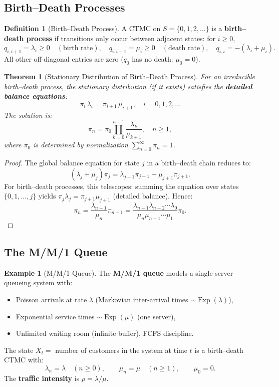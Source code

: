 \documentclass[12pt, a4paper]{article}
\theoremstyle{definition}
\newtheorem{definition}{Definition}[section]
\newtheorem{example}{Example}[section]
\theoremstyle{plain}
\newtheorem{theorem}{Theorem}[section]
\DeclareMathOperator{\Exp}{Exp}
\begin{document}
\subsection{Birth--Death Processes}

\begin{definition}[Birth--Death Process]
A CTMC on $S = \{0,1,2,\ldots\}$ is a \textbf{birth--death process} if transitions only occur between adjacent states: for $i\ge 0$,
\[
  q_{i,i+1} = \lambda_i \ge 0 \quad (\text{birth rate}), \quad q_{i,i-1} = \mu_i \ge 0 \quad (\text{death rate}), \quad q_{i,i} = -(\lambda_i+\mu_i).
\]
All other off-diagonal entries are zero ($q_0$ has no death: $\mu_0=0$).
\end{definition}

\begin{theorem}[Stationary Distribution of Birth--Death Process]
For an irreducible birth--death process, the stationary distribution (if it exists) satisfies the \textbf{detailed balance equations}:
\[
  \pi_i\,\lambda_i = \pi_{i+1}\,\mu_{i+1}, \quad i=0,1,2,\ldots
\]
The solution is:
\[
  \pi_n = \pi_0 \prod_{k=0}^{n-1}\frac{\lambda_k}{\mu_{k+1}}, \quad n\ge 1,
\]
where $\pi_0$ is determined by normalization $\sum_{n=0}^\infty \pi_n = 1$.
\end{theorem}

\begin{proof}
The global balance equation for state $j$ in a birth--death chain reduces to:
\[
  (\lambda_j+\mu_j)\pi_j = \lambda_{j-1}\pi_{j-1} + \mu_{j+1}\pi_{j+1}.
\]
For birth--death processes, this telescopes: summing the equation over states $\{0,1,\ldots,j\}$ yields $\pi_j\lambda_j = \pi_{j+1}\mu_{j+1}$ (detailed balance). Hence:
\[
  \pi_{n} = \frac{\lambda_{n-1}}{\mu_n}\pi_{n-1} = \frac{\lambda_{n-1}\lambda_{n-2}\cdots\lambda_0}{\mu_n\mu_{n-1}\cdots\mu_1}\pi_0.
\]
\end{proof}

\subsection{The M/M/1 Queue}

\begin{example}[M/M/1 Queue]
The \textbf{M/M/1 queue} models a single-server queueing system with:
\begin{itemize}
  \item Poisson arrivals at rate $\lambda$ (Markovian inter-arrival times $\sim\Exp(\lambda)$),
  \item Exponential service times $\sim\Exp(\mu)$ (one server),
  \item Unlimited waiting room (infinite buffer), FCFS discipline.
\end{itemize}
The state $X_t = $ number of customers in the system at time $t$ is a birth--death CTMC with:
\[
  \lambda_n = \lambda \quad (n\ge 0), \qquad \mu_n = \mu \quad (n\ge 1), \qquad \mu_0 = 0.
\]
The \textbf{traffic intensity} is $\rho = \lambda/\mu$.
\end{example}
\end{document}
